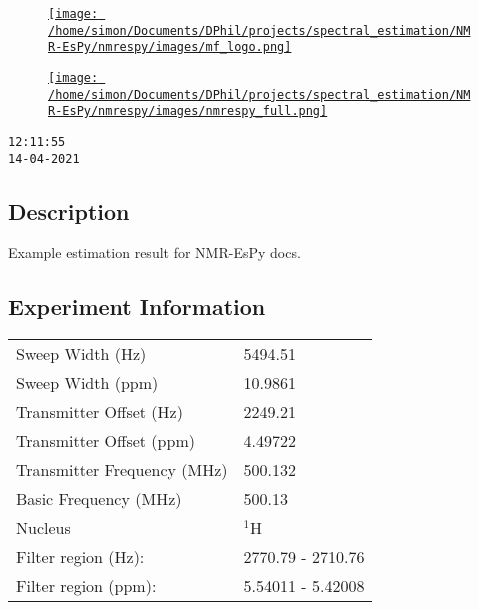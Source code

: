 \documentclass[8pt]{article}
\begin{document}
\begin{figure}[!ht]
\begin{minipage}[b][2.5cm][c]{.72\textwidth}
\href{http://foroozandeh.chem.ox.ac.uk/home}%
{\texttt{[image: /home/simon/Documents/DPhil/projects/spectral\_estimation/NMR-EsPy/nmrespy/images/mf\_logo.png]}}
\end{minipage}
\begin{minipage}[b][2.5cm][c]{.27\textwidth}
\href{https://nmr-espy.readthedocs.io/en/latest/}%
{\texttt{[image: /home/simon/Documents/DPhil/projects/spectral\_estimation/NMR-EsPy/nmrespy/images/nmrespy\_full.png]}}
\end{minipage}
\end{figure}

\texttt{12:11:55\\14-04-2021}

\subsection*{Description}
Example estimation result for NMR-EsPy docs.

\subsection*{Experiment Information}
\hspace{-6pt}
\begin{tabular}{ll}
Sweep Width (Hz) & 5494.51 \\
Sweep Width (ppm) & 10.9861 \\
Transmitter Offset (Hz) & 2249.21 \\
Transmitter Offset (ppm) & 4.49722 \\
Transmitter Frequency (MHz) & 500.132 \\
Basic Frequency (MHz) & 500.13 \\
Nucleus & $^{1}$H \\
Filter region (Hz): & 2770.79 - 2710.76 \\
Filter region (ppm): & 5.54011 - 5.42008 \\

\end{tabular}
\end{document}
